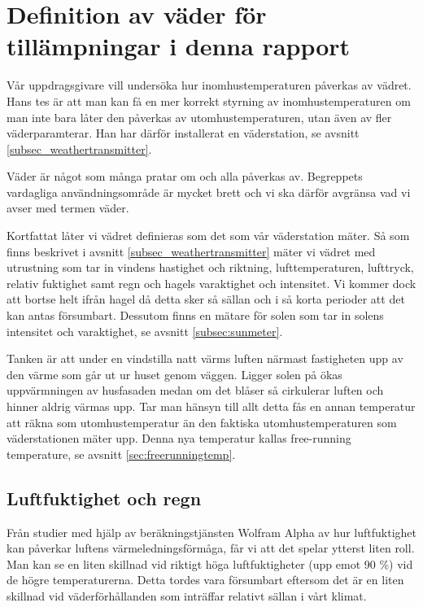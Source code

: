 \section{Definition av väder för tillämpningar i denna rapport}
\label{subsec_weather}
Vår uppdragsgivare vill undersöka hur inomhustemperaturen påverkas av vädret. Hans tes är att man kan få en mer korrekt styrning av inomhustemperaturen om man inte bara låter den påverkas av utomhustemperaturen, utan även av fler väderparamterar. Han har därför installerat en väderstation, se avsnitt \ref{subsec_weathertransmitter}.

Väder är något som många pratar om och alla påverkas av. Begreppets vardagliga användningsområde är mycket brett och vi ska därför avgränsa vad vi avser med termen väder. 

Kortfattat låter vi vädret definieras som det som vår väderstation mäter. Så som finns beskrivet i avsnitt \ref{subsec_weathertransmitter} mäter vi vädret med utrustning som tar in vindens hastighet och riktning, lufttemperaturen, lufttryck, relativ fuktighet samt regn och hagels varaktighet och intensitet. Vi kommer dock att bortse helt ifrån hagel då detta sker så sällan och i så korta perioder att det kan antas försumbart.  Dessutom finns en mätare för solen som tar in solens intensitet och varaktighet, se avsnitt \ref{subsec:sunmeter}. %

Tanken är att under en vindstilla natt värms luften närmast fastigheten upp av den värme som går ut ur huset genom väggen. Ligger solen på ökas uppvärmningen av husfasaden medan om det blåser så cirkulerar luften och hinner aldrig värmas upp. Tar man hänsyn till allt detta fås en annan temperatur att räkna som utomhustemperatur än den faktiska utomhustemperaturen som väderstationen mäter upp. Denna nya temperatur kallas free-running temperature, se avsnitt \ref{sec:freerunningtemp}. %

\subsection{Luftfuktighet och regn}
Från studier med hjälp av beräkningstjänsten Wolfram Alpha\cite{wolframalpha} av hur luftfuktighet kan påverkar luftens värmeledningsförmåga, får vi att det spelar ytterst liten roll. Man kan se en liten skillnad vid riktigt höga luftfuktigheter (upp emot 90 \%) vid de högre temperaturerna. Detta tordes vara försumbart eftersom det är en liten skillnad vid väderförhållanden som inträffar relativt sällan i vårt klimat.

